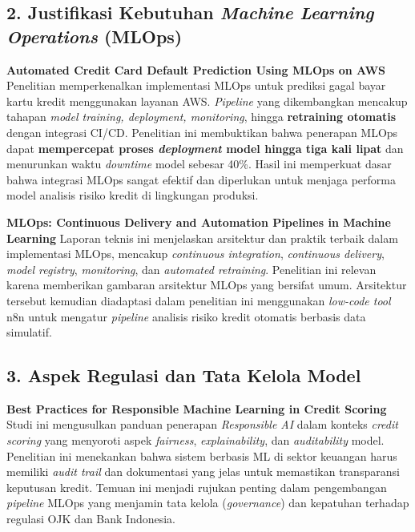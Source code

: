 \subsection*{2. Justifikasi Kebutuhan \textit{Machine Learning Operations} (MLOps)}
\textbf{Automated Credit Card Default Prediction Using MLOps on AWS}
Penelitian memperkenalkan implementasi MLOps untuk prediksi gagal bayar kartu kredit menggunakan layanan AWS. \textit{Pipeline} yang dikembangkan mencakup tahapan \textit{model training, deployment, monitoring}, hingga \textbf{retraining otomatis} dengan integrasi CI/CD. Penelitian ini membuktikan bahwa penerapan MLOps dapat \textbf{mempercepat proses \textit{deployment} model hingga tiga kali lipat} dan menurunkan waktu \textit{downtime} model sebesar 40\%. Hasil ini memperkuat dasar bahwa integrasi MLOps sangat efektif dan diperlukan untuk menjaga performa model analisis risiko kredit di lingkungan produksi.\cite{creditscoringml2024}

\textbf{MLOps: Continuous Delivery and Automation Pipelines in Machine Learning}
Laporan teknis ini menjelaskan arsitektur dan praktik terbaik dalam implementasi MLOps, mencakup \textit{continuous integration}, \textit{continuous delivery}, \textit{model registry}, \textit{monitoring}, dan \textit{automated retraining}. Penelitian ini relevan karena memberikan gambaran arsitektur MLOps yang bersifat umum. Arsitektur tersebut kemudian diadaptasi dalam penelitian ini menggunakan \textit{low-code tool} n8n untuk mengatur \textit{pipeline} analisis risiko kredit otomatis berbasis data simulatif.\cite{Kreuzberger2023}

\subsection*{3. Aspek Regulasi dan Tata Kelola Model}
\textbf{Best Practices for Responsible Machine Learning in Credit Scoring}
Studi ini mengusulkan panduan penerapan \textit{Responsible AI} dalam konteks \textit{credit scoring} yang menyoroti aspek \textit{fairness}, \textit{explainability}, dan \textit{auditability} model. Penelitian ini menekankan bahwa sistem berbasis ML di sektor keuangan harus memiliki \textit{audit trail} dan dokumentasi yang jelas untuk memastikan transparansi keputusan kredit. Temuan ini menjadi rujukan penting dalam pengembangan \textit{pipeline} MLOps yang menjamin tata kelola (\textit{governance}) dan kepatuhan terhadap regulasi OJK dan Bank Indonesia.\cite{Valdrighi2024}


